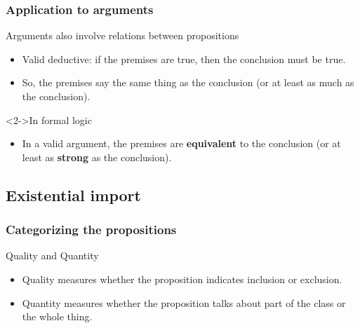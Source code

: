\documentclass[10pt,letterpaper,xcolor=dvipsnames,handout]{beamer}
\begin{document}
\begin{frame}
  \frametitle{Application to arguments}
  
  \begin{block}{Arguments also involve relations between propositions}
    \begin{itemize}
      \item Valid deductive: if the premises are true, then the conclusion must be true.
      \item So, the premises say the same thing as the conclusion (or at least as much as the conclusion).
    \end{itemize}
  \end{block}
  
  \begin{block}<2->{In formal logic}
    \begin{itemize}
      \item In a valid argument, the premises are \textbf{equivalent} to the conclusion (or at least as \textbf{strong} as the conclusion).
    \end{itemize}
  \end{block}
\end{frame}

\subsection{Existential import}

\begin{frame}
  \frametitle{Categorizing the propositions}
  
  \begin{block}{Quality and Quantity}
    \begin{itemize}
      \item<2-> Quality measures whether the proposition indicates inclusion or exclusion.
      \item<3-> Quantity measures whether the proposition talks about part of the class or the whole thing.
    \end{itemize}
  \end{block}
  
    \begin{center}
  \end{center}
\end{frame}
\end{document}
